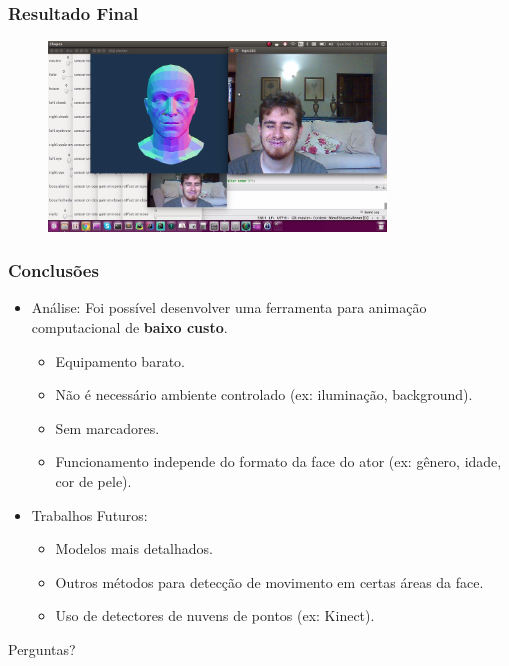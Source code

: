 \documentclass[brazil]{beamer}
\begin{document}
\begin{frame}
\frametitle{Resultado Final}

	\begin{figure}
        \centering
        \includegraphics[width = 0.8\textwidth, keepaspectratio]{./img/result-1.png}
      \end{figure}
\end{frame}


\begin{frame}
\frametitle{Conclusões}
  \begin{itemize}
      \item Análise:
      Foi possível desenvolver uma ferramenta para animação computacional de \textbf{baixo custo}.
      \begin{itemize}
         \item Equipamento barato.
     	 \item Não é necessário ambiente controlado (ex: iluminação, background).
     	 \item Sem marcadores.
     	 \item Funcionamento independe do formato da face do ator (ex: gênero, idade, cor de pele).              
  	  \end{itemize} 
      
      \item Trabalhos Futuros:
      \begin{itemize}
         \item Modelos mais detalhados.
     	 \item Outros métodos para detecção de movimento em certas áreas da face.
     	 \item Uso de detectores de nuvens de pontos (ex: Kinect).           
  	  \end{itemize} 
              
  \end{itemize} 
\end{frame}


\begin{frame}

  Perguntas?
              
\end{frame}
\end{document}

